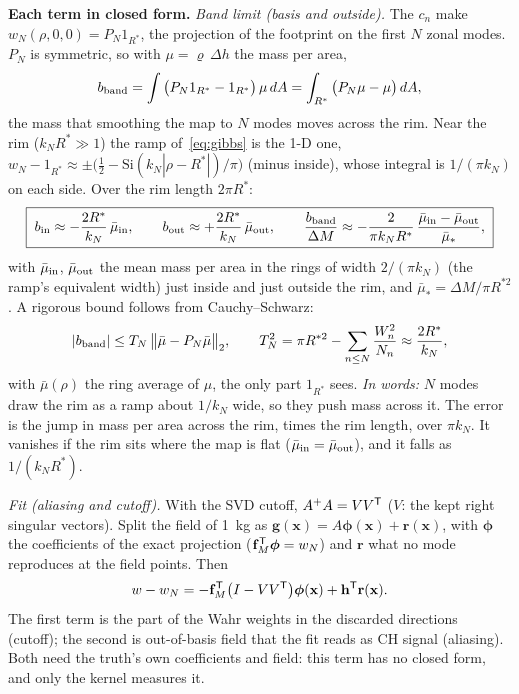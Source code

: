 \documentclass[11pt]{article}
\newcommand{\words}[1]{\emph{In words:} #1}
\begin{document}
\textbf{Each term in closed form.} \emph{Band limit (basis and outside).}
The $c_n$ make $w_N(\rho,0,0)=P_N1_{R^*}$, the projection of the footprint on
the first $N$ zonal modes. $P_N$ is symmetric, so with $\mu=\varrho\,\Delta h$
the mass per area,
\begin{equation}
  b_{\rm band}=\int\big(P_N1_{R^*}-1_{R^*}\big)\,\mu\,dA=\int_{R^*}\big(P_N\mu-\mu\big)\,dA ,
\end{equation}
the mass that smoothing the map to $N$ modes moves across the rim. Near the
rim ($k_NR^*\gg1$) the ramp of~\eqref{eq:gibbs} is the 1-D one,
$w_N-1_{R^*}\approx\pm\big(\tfrac12-\mathrm{Si}(k_N|\rho-R^*|)/\pi\big)$
(minus inside), whose integral is $1/(\pi k_N)$ on each side. Over the rim
length $2\pi R^*$:
\begin{equation}
  \boxed{\;b_{\rm in}\approx-\frac{2R^*}{k_N}\,\bar\mu_{\rm in},\qquad
  b_{\rm out}\approx+\frac{2R^*}{k_N}\,\bar\mu_{\rm out},\qquad
  \frac{b_{\rm band}}{\Delta M}\approx-\frac{2}{\pi k_NR^*}\,
  \frac{\bar\mu_{\rm in}-\bar\mu_{\rm out}}{\bar\mu_*},\;}
  \label{eq:rim}
\end{equation}
with $\bar\mu_{\rm in}$, $\bar\mu_{\rm out}$ the mean mass per area in the
rings of width $2/(\pi k_N)$ (the ramp's equivalent width) just inside and
just outside the rim, and $\bar\mu_*=\Delta M/\pi R^{*2}$. A rigorous bound
follows from Cauchy--Schwarz:
\begin{equation}
  |b_{\rm band}|\le T_N\,\big\|\bar\mu-P_N\bar\mu\big\|_2,\qquad
  T_N^2=\pi R^{*2}-\sum_{n\le N}\frac{W_n^2}{N_n}\approx\frac{2R^*}{k_N},
  \label{eq:cs}
\end{equation}
with $\bar\mu(\rho)$ the ring average of $\mu$, the only part $1_{R^*}$ sees.
\words{$N$ modes draw the rim as a ramp about $1/k_N$ wide, so they push mass
across it. The error is the jump in mass per area across the rim, times the
rim length, over $\pi k_N$. It vanishes if the rim sits where the map is flat
($\bar\mu_{\rm in}=\bar\mu_{\rm out}$), and it falls as $1/(k_NR^*)$.}

\emph{Fit (aliasing and cutoff).} With the SVD cutoff, $A^+A=VV^{\sf T}$
($V$: the kept right singular vectors). Split the field of 1~kg as
$\mathbf g(\mathbf x)=A\boldsymbol\phi(\mathbf x)+\mathbf r(\mathbf x)$, with
$\boldsymbol\phi$ the coefficients of the exact projection
($\mathbf f_M^{\sf T}\boldsymbol\phi=w_N$) and $\mathbf r$ what no mode
reproduces at the field points. Then
\begin{equation}
  w-w_N=-\mathbf f_M^{\sf T}\big(I-VV^{\sf T}\big)\boldsymbol\phi(\mathbf x)
  +\mathbf h^{\sf T}\mathbf r(\mathbf x).
\end{equation}
The first term is the part of the Wahr weights in the discarded directions
(cutoff); the second is out-of-basis field that the fit reads as CH signal
(aliasing). Both need the truth's own coefficients and field: this term has no
closed form, and only the kernel measures it.
\end{document}
